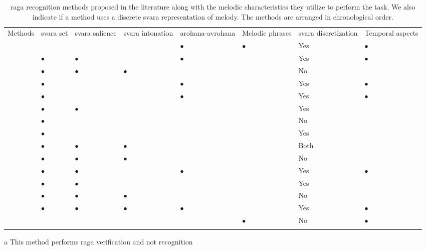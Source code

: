 \begin{table}
	\begin{threeparttable} 
		\small
		\begin{centering}
			\begin{tabular}{l L{1.85cm} L{1.85cm} L{1.85cm} L{2cm} L{1.5cm} L{2cm} L{2cm}}
				\tabletop
				Methods & \Gls{svara} set & \Gls{svara} salience & \Gls{svara} intonation & \gls{arohana}-\gls{avrohana} & Melodic phrases & \Gls{svara} discretization & Temporal aspects\tabularnewline
				\tablemid
				\cite{pandey2003tansen} &  &  &  & $\bullet$ & $\bullet$ & Yes & $\bullet$\tabularnewline
				\cite{chordia2007raag} & $\bullet$ & $\bullet$ &  & $\bullet$ &  & Yes & $\bullet$\tabularnewline
				\cite{belle2009raga} & $\bullet$ & $\bullet$ & $\bullet$ &  &  & No & \tabularnewline
				\cite{Shetty2009} & $\bullet$ &  &  & $\bullet$ &  & Yes & $\bullet$\tabularnewline
				\cite{sridhar2009raga} & $\bullet$ &  &  & $\bullet$ &  & Yes & $\bullet$\tabularnewline
				\cite{koduri2011survey} & $\bullet$ & $\bullet$ &  &  &  & Yes & \tabularnewline
				\cite{ranjani2011carnatic} & $\bullet$ &  &  &  &  & No & \tabularnewline
				\cite{chakraborty2012object} & $\bullet$ &  &  &  &  & Yes & \tabularnewline
				\cite{koduri2012raga} & $\bullet$ & $\bullet$ & $\bullet$ &  &  & Both & \tabularnewline
				\cite{chordia2013joint} & $\bullet$ & $\bullet$ & $\bullet$ &  &  & No & \tabularnewline
				\cite{dighe2013scale} & $\bullet$ & $\bullet$ &  & $\bullet$ &  & Yes & $\bullet$\tabularnewline
				\cite{dighe2013swara} & $\bullet$ & $\bullet$ &  &  &  & Yes & \tabularnewline
				\cite{koduri2014intonation} & $\bullet$ & $\bullet$ & $\bullet$ &  &  & No & \tabularnewline
				\cite{kumar2014identifying} & $\bullet$ & $\bullet$ & $\bullet$ & $\bullet$ &  & Yes & $\bullet$\tabularnewline
				\cite{shrey_ISMIR_2015} &  &  &  &  & $\bullet$ & No & $\bullet$\tabularnewline	
				\tablebot
			\end{tabular}
			\par \end{centering}
		
		\begin{tablenotes}
			\item[a] This method performs \gls{raga} verification and not recognition
		\end{tablenotes}
		\caption[Melodic characteristics utilized by the existing \gls{raga} recognition methods]{\Gls{raga} recognition methods proposed in the literature along with the melodic characteristics they utilize to perform the task. We also indicate if a method uses a discrete \gls{svara} representation of melody. The methods are arranged in chronological order.}
		\label{tab:raga_recognition_methods_melodic_characteristics}
	\end{threeparttable}
\end{table}


